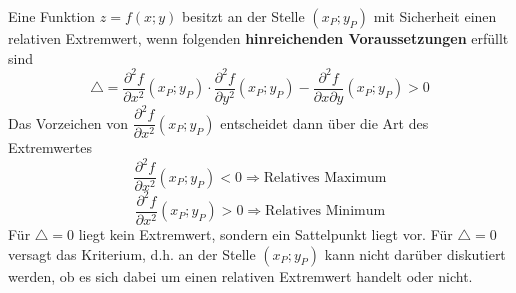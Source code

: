 Eine Funktion $z=f\left(x; y\right)$ besitzt an der Stelle $\left(x_P; y_P\right)$ mit Sicherheit einen relativen Extremwert, wenn folgenden \textbf{hinreichenden Voraussetzungen} erfüllt sind
\begin{equation}
\boxed{\triangle =\dfrac{\partial^2 f}{\partial x^2}\left(x_P; y_P\right)\cdot \dfrac{\partial^2 f}{\partial y^2}\left(x_P; y_P\right)-\dfrac{\partial^2 f}{\partial x\partial y}\left(x_P; y_P\right)>0}
\end{equation}
Das Vorzeichen von $\dfrac{\partial^2 f}{\partial x^2}\left(x_P; y_P\right)$ entscheidet dann über die Art des Extremwertes
\begin{equation}
\boxed{\dfrac{\partial^2 f}{\partial x^2}\left(x_P; y_P\right)<0\Longrightarrow \text{Relatives Maximum}}
\end{equation}
\begin{equation}
\boxed{\dfrac{\partial^2 f}{\partial x^2}\left(x_P; y_P\right)>0\Longrightarrow \text{Relatives Minimum}}
\end{equation}
Für $\triangle =0$ liegt kein Extremwert, sondern ein Sattelpunkt liegt vor. Für $\triangle =0$ versagt das Kriterium, d.h. an der Stelle $\left(x_P; y_P\right)$ kann nicht darüber diskutiert werden, ob es sich dabei um einen relativen Extremwert handelt oder nicht.
